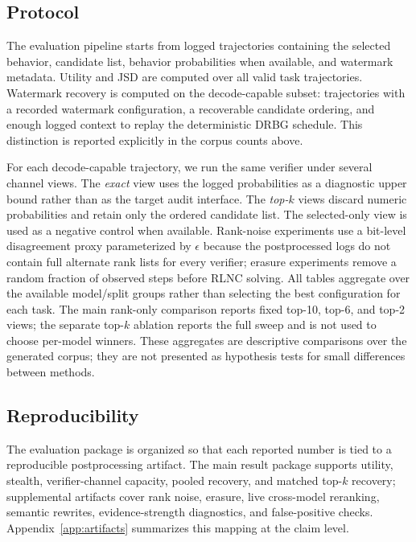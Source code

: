 \documentclass[conference,compsoc]{IEEEtran}
\begin{document}
\subsection{Protocol}

The evaluation pipeline starts from logged trajectories containing the selected behavior, candidate list, behavior probabilities when available, and watermark metadata. Utility and JSD are computed over all valid task trajectories. Watermark recovery is computed on the decode-capable subset: trajectories with a recorded watermark configuration, a recoverable candidate ordering, and enough logged context to replay the deterministic DRBG schedule. This distinction is reported explicitly in the corpus counts above.

For each decode-capable trajectory, we run the same verifier under several channel views. The \emph{exact} view uses the logged probabilities as a diagnostic upper bound rather than as the target audit interface. The \emph{top-$k$} views discard numeric probabilities and retain only the ordered candidate list. The selected-only view is used as a negative control when available. Rank-noise experiments use a bit-level disagreement proxy parameterized by $\epsilon$ because the postprocessed logs do not contain full alternate rank lists for every verifier; erasure experiments remove a random fraction of observed steps before RLNC solving. All tables aggregate over the available model/split groups rather than selecting the best configuration for each task. The main rank-only comparison reports fixed top-10, top-6, and top-2 views; the separate top-$k$ ablation reports the full sweep and is not used to choose per-model winners. These aggregates are descriptive comparisons over the generated corpus; they are not presented as hypothesis tests for small differences between methods.

\subsection{Reproducibility}

The evaluation package is organized so that each reported number is tied to a reproducible postprocessing artifact. The main result package supports utility, stealth, verifier-channel capacity, pooled recovery, and matched top-$k$ recovery; supplemental artifacts cover rank noise, erasure, live cross-model reranking, semantic rewrites, evidence-strength diagnostics, and false-positive checks. Appendix~\ref{app:artifacts} summarizes this mapping at the claim level.
\end{document}
